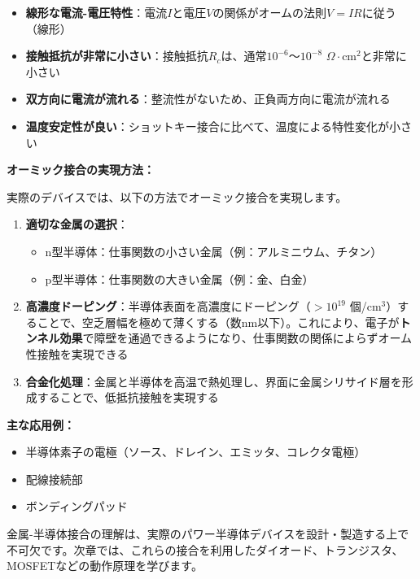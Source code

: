 \begin{itemize}
\item \textbf{線形な電流-電圧特性}：電流$I$と電圧$V$の関係がオームの法則$V = IR$に従う（線形）

\item \textbf{接触抵抗が非常に小さい}：接触抵抗$R_c$は、通常$10^{-6}$〜$10^{-8}$ $\Omega \cdot$cm$^2$と非常に小さい

\item \textbf{双方向に電流が流れる}：整流性がないため、正負両方向に電流が流れる

\item \textbf{温度安定性が良い}：ショットキー接合に比べて、温度による特性変化が小さい
\end{itemize}

\textbf{オーミック接合の実現方法：}

実際のデバイスでは、以下の方法でオーミック接合を実現します。

\begin{enumerate}
\item \textbf{適切な金属の選択}：
\begin{itemize}
\item n型半導体：仕事関数の小さい金属（例：アルミニウム、チタン）
\item p型半導体：仕事関数の大きい金属（例：金、白金）
\end{itemize}

\item \textbf{高濃度ドーピング}：半導体表面を高濃度にドーピング（$> 10^{19}$ 個/cm$^3$）することで、空乏層幅を極めて薄くする（数nm以下）。これにより、電子が\textbf{トンネル効果}で障壁を通過できるようになり、仕事関数の関係によらずオーム性接触を実現できる

\item \textbf{合金化処理}：金属と半導体を高温で熱処理し、界面に金属シリサイド層を形成することで、低抵抗接触を実現する
\end{enumerate}

\textbf{主な応用例：}
\begin{itemize}
\item 半導体素子の電極（ソース、ドレイン、エミッタ、コレクタ電極）
\item 配線接続部
\item ボンディングパッド
\end{itemize}

金属-半導体接合の理解は、実際のパワー半導体デバイスを設計・製造する上で不可欠です。次章では、これらの接合を利用したダイオード、トランジスタ、MOSFETなどの動作原理を学びます。


